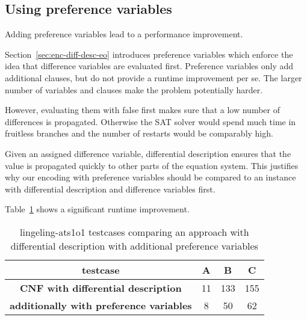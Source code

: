 \subsection{Using preference variables}
\label{sec:preference-variables}
%
\begin{prop}
  Adding preference variables lead to a performance improvement.
\end{prop}
%
Section~\ref{sec:enc-diff-desc-eo} introduces preference variables
which enforce the idea that difference variables are evaluated first.
Preference variables only add additional clauses, but do not provide
a runtime improvement per se. The larger number of variables and
clauses make the problem potentially harder.

However, evaluating them with false first makes sure that a low
number of differences is propagated. Otherwise the SAT solver would
spend much time in fruitless branches and the number of restarts
would be comparably high.

Given an assigned difference variable, differential description
ensures that the value is propagated quickly to other parts of
the equation system. This justifies why our encoding with preference
variables should be compared to an instance with differential
description and difference variables first.

Table~\ref{tab:pref-vars-results} shows a significant runtime improvement.

\begin{table}[!h]
  \begin{center}
    \begin{tabular}{c|ccc}
      \textbf{testcase}                                & \textbf{A} &  \textbf{B} &  \textbf{C} \\
    \hline
      \textbf{CNF with differential description}       &         11 &         133 &       155 \\
      \textbf{additionally with preference variables}  &          8 &          50 &        62 \\
    \end{tabular}
    \caption{
      lingeling-ats1o1 testcases comparing an approach
      with differential description with additional preference variables
    }
    \label{tab:pref-vars-results}
  \end{center}
\end{table}


